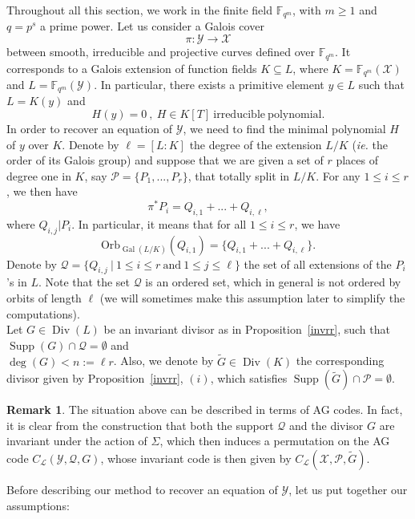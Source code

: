 \documentclass[10pt]{article}
\theoremstyle{definition}
\newtheorem{rq1}[thm]{Remark}
\theoremstyle{definition}
\theoremstyle{definition}
\newcommand{\fqm}{\mathbb{F}_{q^m}}
\newcommand{\su}{\subseteq}
\newcommand{\X}{\mathcal{X}}
\newcommand{\Y}{\mathcal{Y}}
\newcommand{\PR}{\mathcal{P}}
\newcommand{\QR}{\mathcal{Q}}
\newcommand{\Div}{\operatorname{Div}}
\newcommand{\Supp}{\operatorname{Supp}}
\newcommand{\Gal}{\operatorname{Gal}}
\newcommand{\calL}{\mathcal{L}}
\begin{document}
Throughout all this section, we work in the finite field $\fqm$, with $m \geq 1$ and $q=p^s$ a prime power. Let us consider a Galois cover 
\[\pi : \Y \longrightarrow \X\]
between smooth, irreducible and projective curves defined over $\fqm$. It corresponds to a Galois extension of function fields $K \su L$,
where $K=\fqm(\X)$ and $L=\fqm(\Y)$. In particular, there exists a primitive element $y \in L$ such that $L=K(y)$ and
\[ H(y)=0 \ , \ H \in K[T] \ \mathrm{irreducible \ polynomial.}\]
In order to recover an equation of $\Y$, we need to find the minimal polynomial $H$ of $y$ over $K$. Denote by $\ell=[L:K]$ the degree of the extension $L/K$ (\textit{ie.} the order of its Galois group) and suppose that we are given a set of $r$ places of degree one in $K$, say $\PR = \{P_1,...,P_r\}$, that totally split in $L/K$. For any $1 \leq i \leq r$, we then have
\[\pi^*P_i = Q_{i,1} + ... + Q_{i,\ell},\]
where $Q_{i,j}|P_i$. In particular, it means that for all $1\leq i\leq r$, we have 
\[\mathrm{Orb}_{\Gal(L/K)}(Q_{i,1})=\{Q_{i,1} + ... + Q_{i,\ell}\}.\]
Denote by $\QR = \{Q_{i,j} \ | \ 1 \leq i \leq r \ \mathrm{and} \ 1 \leq j \leq \ell\}$ the set of all extensions of the $P_i$'s in $L$. Note that the set $\QR$ is an ordered set, which in general is not ordered by orbits of length $\ell$ (we will sometimes make this assumption later to simplify the computations). \\
Let $G \in \Div(L)$ be an invariant divisor as in Proposition~\ref{invrr}, such that $\Supp(G) \cap \QR = \emptyset$ and \\ $\deg(G)<n:=\ell r$. Also, we denote by $\tilde{G} \in \Div(K)$ the corresponding divisor given by Proposition~\ref{invrr}, $(i)$, which satisfies $\Supp(\tilde{G}) \cap \PR = \emptyset$. 

\begin{rq1} 
The situation above can be described in terms of AG codes. In fact, it is clear from the construction that both the support $\QR$ and the divisor $G$ are invariant under the action of $\Sigma$, which then induces a permutation on the AG code $C_{\calL}(\Y,\QR,G)$, whose invariant code is then given by $C_{\calL}(\X,\PR,\tilde{G})$. 
\end{rq1}

Before describing our method to recover an equation of $\Y$, let us put together our assumptions:
\end{document}
